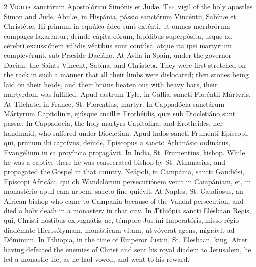 \begin{paracol}{2}
\lettrine[lines=1]{V}{igília} sanctórum Apostolórum Simónis et Judæ.
\switchcolumn
{}
\lettrine[lines=1]{T}{he} vigil of the holy apostles Simon and Jude.
\switchcolumn*
{}
Abulæ, in Hispánia, 
 pássio sanctórum Vincéntii, Sabínæ et Christétæ. Hi primum in equúleo 
 ádeo sunt exténti, ut omnes membrórum compáges laxaréntur; deínde cápita 
 eórum, lapídibus superpósita, usque ad cérebri excussiónem válidis véctibus 
 sunt contúsa, atque ita ipsi martyrium complevérunt, sub Præside Daciáno.
\switchcolumn
{}
At Avila in Spain, under the 
 governor Dacian, the Saints Vincent, Sabina, and Christeta. They were 
 first stretched on the rack in such a manner that all their limbs were 
 dislocated; then stones being laid on their heads, and their brains beaten 
 out with heavy bars, their martyrdom was fulfilled.
\switchcolumn*
{}
Apud castrum Tyle, in 
 Gállia, sancti Floréntii Mártyris.
\switchcolumn
{}
At Tilchatel in France, St. 
 Florentius, martyr.
\switchcolumn*
{}
In Cappadócia sanctárum 
 Mártyrum Capitolínæ, ejúsque ancíllæ Erothéidis, quæ sub Diocletiáno sunt 
 passæ.
\switchcolumn
{}
In Cappadocia, the holy martyrs 
 Capitolina, and Erotheides, her handmaid, who suffered under Diocletian.
\switchcolumn*
{}
Apud Indos sancti 
 Fruménti Epíscopi, qui, primum ibi captívus, deínde, Epíscopus a sancto 
 Athanásio ordinátus, Evangélium in ea província propagávit.
\switchcolumn
{}
In India, St. Frumentius, bishop. 
 While he was a captive there he was consecrated bishop by St. Athanasius, 
 and propagated the Gospel in that country.
\switchcolumn*
{}
Neápoli, in Campánia, sancti Gaudiósi, Epíscopi Africáni, qui ob Wandalórum persecutiónem venit in 
 Campániam, et, in monastério apud eam urbem, sancto fine quiévit.
\switchcolumn
{}
At Naples, St. Gaudiosus, an African 
 bishop who came to Campania because of the Vandal persecution, and died a 
 holy death in a monastery in that city.
\switchcolumn*
{}
In Æthiópia sancti 
 Elésbaan Regis, qui, Christi hóstibus expugnátis, ac, témpore Justíni 
 Imperatóris, misso régio diadémate Hierosólymam, monásticam vitam, ut 
 vóverat agens, migrávit ad Dóminum.
\switchcolumn
{}
In Ethiopia, in the time of Emperor 
 Justin, St. Elesbaan, king. After having defeated the enemies of 
 Christ and sent his royal diadem to Jerusalem, he led a monastic life, as he 
 had vowed, and went to his reward.
\switchcolumn*
{}
\end{paracol}


